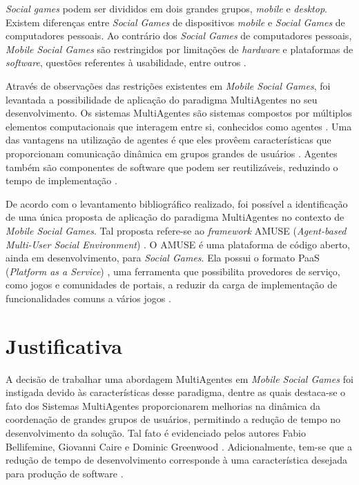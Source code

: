 \textit{Social games} podem ser divididos em dois grandes grupos, \textit{mobile} e \textit{desktop}. Existem diferen\c{c}as entre \textit{Social Games} de dispositivos \textit{mobile} e \textit{Social Games} de computadores pessoais.
Ao contrário dos \textit{Social Games} de computadores pessoais, \textit{Mobile Social Games} são restringidos por limita\c{c}\~oes de \textit{hardware} e plataformas de \textit{software}, questões
referentes à usabilidade, entre outros \cite{yamakani2011}.

Através de observações das restrições existentes em \textit{Mobile Social Games}, foi levantada a possibilidade de aplicação do paradigma MultiAgentes
no seu desenvolvimento. Os sistemas MultiAgentes são sistemas
compostos por múltiplos elementos computacionais que interagem entre si, conhecidos como agentes \cite{wooldridge2009}.
Uma das vantagens na utilização de agentes é que eles provêem características que proporcionam comunicação dinâmica em
grupos grandes de usuários \cite{bergenti2015}. Agentes também são componentes de software que podem ser reutilizáveis, reduzindo o tempo de
implementação \cite{bergentiHuhns2014}.

De acordo com o levantamento bibliográfico realizado, foi possível a identificação de uma única proposta de aplicação do paradigma MultiAgentes no contexto de \textit{Mobile Social Games}. Tal proposta refere-se ao \textit{framework} AMUSE (\textit{Agent-based Multi-User Social Environment})
\cite{amuse}. O AMUSE é uma plataforma de código aberto, ainda em desenvolvimento, para \textit{Social Games}.
Ela possui o formato PaaS (\textit{Platform as a Service}) \cite{bergenti2015}, uma ferramenta que possibilita provedores de serviço,
como jogos e comunidades de portais, a reduzir da carga de implementação de funcionalidades
comuns a vários jogos \cite{bergenti2015}.

\section{Justificativa}

A decisão de trabalhar uma abordagem MultiAgentes em \textit{Mobile Social Games} foi instigada devido às características desse paradigma,
dentre as quais destaca-se o fato dos Sistemas MultiAgentes proporcionarem
melhorias na dinâmica da coordenação de grandes grupos
de usuários, permitindo a redução de tempo no desenvolvimento da solução. Tal
fato é evidenciado pelos autores Fabio Bellifemine, Giovanni Caire e Dominic
Greenwood \cite{fabio2007}. Adicionalmente, tem-se que a redução de tempo de
desenvolvimento corresponde à uma característica desejada para produção de
software \cite{bergenti2015}.

